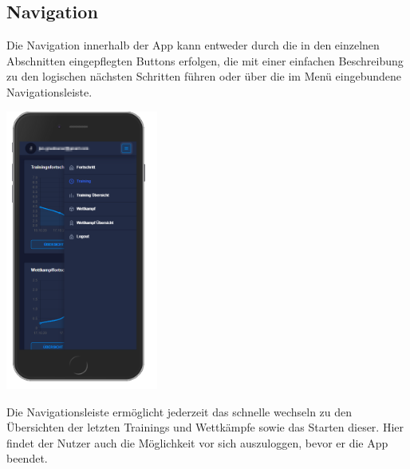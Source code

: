 \documentclass[a4paper]{article}
\theoremstyle{definition}
\begin{document}
\subsection*{Navigation}
Die Navigation innerhalb der App kann entweder durch die in den einzelnen Abschnitten eingepflegten Buttons erfolgen, die mit einer einfachen Beschreibung zu den logischen nächsten Schritten führen oder über die im Menü eingebundene Navigationsleiste.
\vspace{0.25cm}
\begin{center}
	\includegraphics[width= 5cm, keepaspectratio]{img/nav}
\end{center}
\vspace{0.25cm}
Die Navigationsleiste ermöglicht jederzeit das schnelle wechseln zu den Übersichten der letzten Trainings und Wettkämpfe sowie das Starten dieser. Hier findet der Nutzer auch die Möglichkeit vor sich auszuloggen, bevor er die App beendet.
\end{document}
